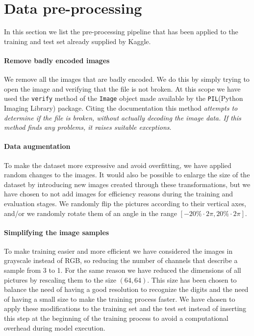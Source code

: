 \section{Data pre-processing}\label{1_preProcessing}
In this section we list the pre-processing pipeline that has been applied to the training and test set already supplied by Kaggle.

\paragraph{Remove badly encoded images}
We remove all the images that are badly encoded. We do this by simply trying to open the image and verifying that the file is not broken. At this scope we have used the \texttt{verify} method of the \texttt{Image} object made available by the \texttt{PIL}(Python Imaging Library) package. Citing the documentation this method \textit{attempts to determine if the file is broken, without actually decoding the image data. If this method finds any problems, it raises suitable exceptions}.

\paragraph{Data augmentation}
To make the dataset more expressive and avoid overfitting, we have applied random changes to the images. It would also be possible to enlarge the size of the dataset by introducing new images created through these transformations, but we have chosen to not add images for efficiency reasons during the training and evaluation stages. We randomly flip the pictures according to their vertical axes, and/or we randomly rotate them of an angle in the range $\left[-20\% \cdot 2\pi, 20\% \cdot 2\pi\right]$.

\paragraph{Simplifying the image samples}
To make training easier and more efficient we have considered the images in grayscale instead of RGB, so reducing the number of channels that describe a sample from 3 to 1. For the same reason we have reduced the dimensions of all pictures by rescaling them to the size $\left(64,64\right)$. This size has been chosen to balance the need of having a good resolution to recognize the digits and the need of having a small size to make the training process faster. We have chosen to apply these modifications to the training set and the test set instead of inserting this step at the beginning of the training process to avoid a computational overhead during model execution.


